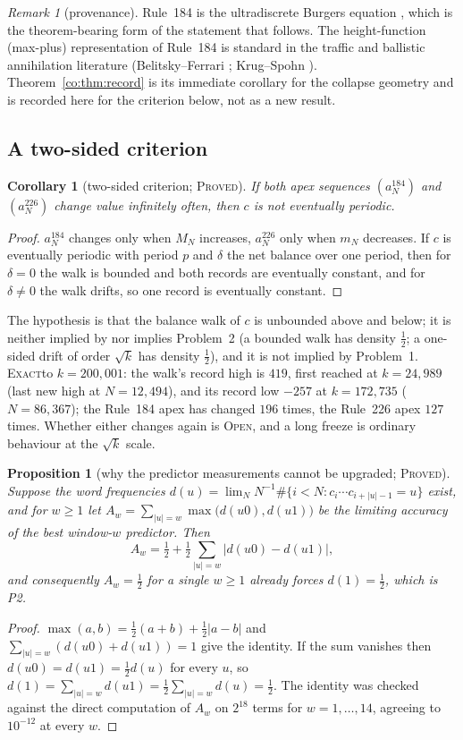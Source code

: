 \documentclass[11pt]{article}
\newtheorem{proposition}[theorem]{Proposition}
\newtheorem{corollary}[theorem]{Corollary}
\theoremstyle{definition}
\theoremstyle{remark}
\newtheorem{remark}[theorem]{Remark}
\newcommand{\PROVED}{\textsc{Proved}}
\newcommand{\EXACT}{\textsc{Exact}}
\newcommand{\OPEN}{\textsc{Open}}
\begin{document}
\begin{remark}[provenance]
Rule~184 is the ultradiscrete Burgers equation \cite{NT}, which is the theorem-bearing form of the
statement that follows. The height-function (max-plus) representation of Rule~184 is standard in the traffic and ballistic
annihilation literature (Belitsky--Ferrari \cite{BF}; Krug--Spohn \cite{KS}). Theorem~\ref{co:thm:record} is its immediate
corollary for the collapse geometry and is recorded here for the criterion below, not as a new result.
\end{remark}

\subsection{A two-sided criterion}

\begin{corollary}[two-sided criterion; \PROVED]\label{co:cor:twosided}
If both apex sequences $(a^{184}_N)$ and $(a^{226}_N)$ change value infinitely often, then $c$ is not
eventually periodic.
\end{corollary}
\begin{proof}
$a^{184}_N$ changes only when $M_N$ increases, $a^{226}_N$ only when $m_N$ decreases. If $c$ is
eventually periodic with period $p$ and $\delta$ the net balance over one period, then for $\delta=0$ the
walk is bounded and both records are eventually constant, and for $\delta\ne 0$ the walk drifts, so one
record is eventually constant.
\end{proof}

The hypothesis is that the balance walk of $c$ is unbounded above and below; it is neither implied by nor implies
Problem~2 (a bounded walk has density $\tfrac12$; a one-sided drift of order $\sqrt k$ has density $\tfrac12$), and it is not implied by Problem~1. \EXACT to $k=200{,}001$: the walk's
record high is $419$, first reached at $k=24{,}989$ (last new high at $N=12{,}494$), and its record low
$-257$ at $k=172{,}735$ ($N=86{,}367$); the Rule~184 apex has changed $196$ times, the Rule~226 apex
$127$ times. Whether either changes again is \OPEN, and a long freeze is ordinary behaviour at the
$\sqrt{k}$ scale.

\begin{proposition}[why the predictor measurements cannot be upgraded; \PROVED]\label{co:windowbound}
Suppose the word frequencies $d(u)=\lim_N N^{-1}\#\{i<N:c_{i}\cdots c_{i+|u|-1}=u\}$ exist, and for
$w\ge1$ let $A_w=\sum_{|u|=w}\max\bigl(d(u0),d(u1)\bigr)$ be the limiting accuracy of the best
window-$w$ predictor. Then
\[
A_w=\tfrac12+\tfrac12\sum_{|u|=w}\bigl|d(u0)-d(u1)\bigr| ,
\]
and consequently $A_w=\tfrac12$ for a \emph{single} $w\ge1$ already forces $d(1)=\tfrac12$, which is P2.
\end{proposition}
\begin{proof}
$\max(a,b)=\tfrac12(a+b)+\tfrac12|a-b|$ and $\sum_{|u|=w}(d(u0)+d(u1))=1$ give the identity. If the sum
vanishes then $d(u0)=d(u1)=\tfrac12 d(u)$ for every $u$, so
$d(1)=\sum_{|u|=w}d(u1)=\tfrac12\sum_{|u|=w}d(u)=\tfrac12$. The identity was checked against the direct
computation of $A_w$ on $2^{18}$ terms for $w=1,\dots,14$, agreeing to $10^{-12}$ at every $w$.
\end{proof}
\end{document}
